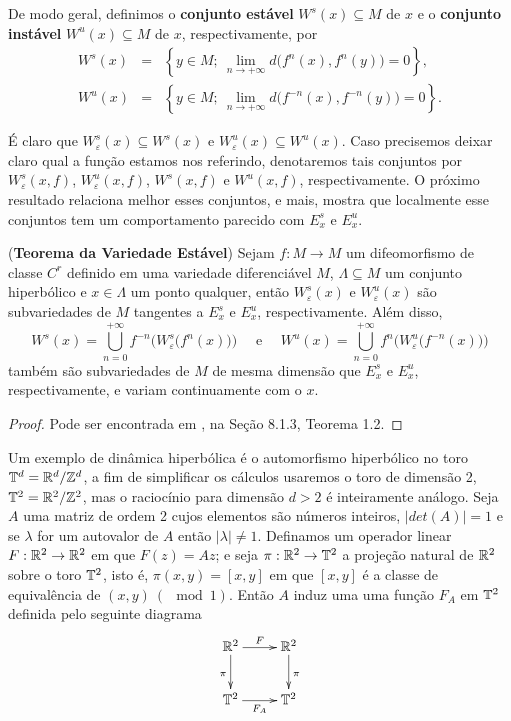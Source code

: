 De modo geral, definimos o \textbf{conjunto estável} $W^s(x)\subseteq M$ de $x$ e o \textbf{conjunto instável} $W^u(x)\subseteq M$ de $x$, respectivamente, por
\begin{eqnarray*}
W^s(x) & = & \left\{y\in M;\ \lim_{n\to+\infty}d\big(f^n(x),f^n(y)\big)=0\right\},\\
W^u(x) & = & \left\{y\in M;\ \lim_{n\to+\infty}d\big(f^{-n}(x),f^{-n}(y)\big)=0\right\}.
\end{eqnarray*}

É claro que $W^s_{\varepsilon}(x)\subseteq W^s(x)$ e $W^u_{\varepsilon}(x)\subseteq W^u(x)$. Caso precisemos deixar claro qual a função estamos nos referindo, denotaremos tais conjuntos por $W^s_{\varepsilon}(x,f)$, $W^u_{\varepsilon}(x,f)$, $W^s(x,f)$ e $W^u(x,f)$, respectivamente. O próximo resultado relaciona melhor esses conjuntos, e mais, mostra que localmente esse conjuntos tem um comportamento parecido com $E^s_x$ e $E^u_x$.

\begin{teorema}\label{teovarest}(\textbf{Teorema da Variedade Estável}) Sejam $f:M\to M$ um difeomorfismo de classe $C^r$ definido em uma variedade diferenciável $M$, $\Lambda\subseteq M$ um conjunto hiperbólico e $x\in\Lambda$ um ponto qualquer, então $W^s_{\varepsilon}(x)$ e $W^u_{\varepsilon}(x)$ são subvariedades de $M$ tangentes a $E^s_x$ e $E^u_x$, respectivamente. Além disso,
\begin{equation*}
W^s(x)=\bigcup_{n=0}^{+\infty}f^{-n}\Big(W^s_{\varepsilon}\big(f^{n}(x)\big)\Big)\quad\text{ e }\quad W^u(x)=\bigcup_{n=0}^{+\infty}f^n\Big(W^u_{\varepsilon}\big(f^{-n}(x)\big)\Big)
\end{equation*}
também são subvariedades de $M$ de mesma dimensão que $E^s_x$ e $E^u_x$, respectivamente, e variam continuamente com o $x$. 
\end{teorema}

\begin{proof} Pode ser encontrada em \cite{robinson}, na Seção 8.1.3, Teorema 1.2.
\end{proof}

Um exemplo de dinâmica hiperbólica é o automorfismo hiperbólico no toro $\mathbb{T}^d=\mathbb{R}^d/\mathbb{Z}^d$, a fim de simplificar os cálculos usaremos o toro de dimensão 2, $\mathbb{T}^2=\mathbb{R}^2/\mathbb{Z}^2$, mas o raciocínio para dimensão $d>2$ é inteiramente análogo. Seja $A$ uma matriz de ordem 2 cujos elementos são números inteiros, $|det(A)|=1$ e se $\lambda$ for um autovalor de $A$ então $|\lambda|\neq1$. Definamos um operador linear $F:\mathbb{R}^2\to\mathbb{R}^2$ em que $F(z)=Az$; e seja $\pi:\mathbb{R}^2\to\mathbb{T}^2$ a projeção natural de $\mathbb{R}^2$ sobre o toro $\mathbb{T}^2$, isto é, $\pi(x,y)=[x,y]$ em que $[x,y]$ é a classe de equivalência de $(x,y)\ (\mod 1)$. Então $A$ induz uma uma função $F_A$ em $\mathbb{T}^2$ definida pelo seguinte diagrama $$\xymatrix{
        \R^2 \ar[r]^{F} \ar[d]_{\pi} & \R^2 \ar[d]^{\pi} \\
        \T^2 \ar[r]_{F_A}       & \T^2}$$

